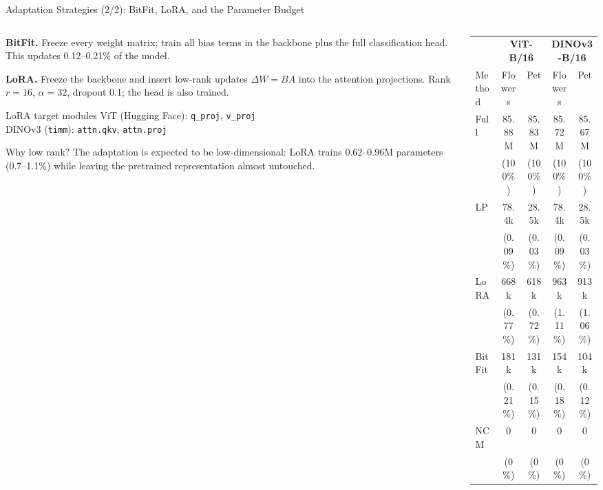\documentclass[10pt, aspectratio=169]{beamer}
\begin{document}
\begin{frame}[t]{Adaptation Strategies (2/2): BitFit, LoRA, and the Parameter Budget}
  \begin{columns}[T]
    \begin{column}{0.52\textwidth}
      \small
      \textbf{BitFit.} Freeze every weight matrix; train all bias terms in the backbone plus the full classification head. This updates 0.12--0.21\% of the model.
      \vspace{0.15cm}

      \textbf{LoRA.} Freeze the backbone and insert low-rank updates $\Delta W = BA$ into the attention projections. Rank $r=16$, $\alpha=32$, dropout 0.1; the head is also trained.
      \vspace{0.15cm}

      \begin{block}{LoRA target modules}
        \footnotesize
        ViT (Hugging Face): \texttt{q\_proj}, \texttt{v\_proj} \\
        DINOv3 (\texttt{timm}): \texttt{attn.qkv}, \texttt{attn.proj}
      \end{block}
      \begin{block}{Why low rank?}
        \footnotesize
        The adaptation is expected to be low-dimensional: LoRA trains 0.62--0.96M parameters (0.7--1.1\%) while leaving the pretrained representation almost untouched.
      \end{block}
    \end{column}
    \begin{column}{0.46\textwidth}
      \centering
      \scriptsize
      \setlength{\tabcolsep}{2.5pt}
      \begin{tabular}{lcccc}
        \toprule
        & \multicolumn{2}{c}{\textbf{ViT-B/16}} & \multicolumn{2}{c}{\textbf{DINOv3-B/16}} \\
        \cmidrule(lr){2-3}\cmidrule(lr){4-5}
        Method & Flowers & Pet & Flowers & Pet \\
        \midrule
        Full & 85.88M & 85.83M & 85.72M & 85.67M \\
             & (100\%) & (100\%) & (100\%) & (100\%) \\
        LP & 78.4k & 28.5k & 78.4k & 28.5k \\
           & (0.09\%) & (0.03\%) & (0.09\%) & (0.03\%) \\
        LoRA & 668k & 618k & 963k & 913k \\
             & (0.77\%) & (0.72\%) & (1.11\%) & (1.06\%) \\
        BitFit & 181k & 131k & 154k & 104k \\
               & (0.21\%) & (0.15\%) & (0.18\%) & (0.12\%) \\
        \rowcolor{best}
        NCM & 0 & 0 & 0 & 0 \\
            & (0\%) & (0\%) & (0\%) & (0\%) \\
        \bottomrule
      \end{tabular}


\end{column}
\end{columns}
\end{frame}
\end{document}
